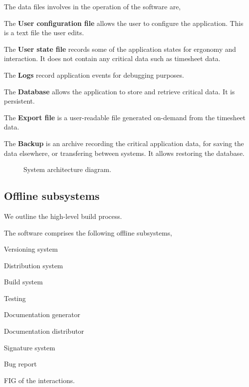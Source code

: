 The data files involves in the operation of the software are,
\begin{compactitem}
\item The \textbf{User configuration file} allows the user to configure the
  application. This is a text file the user edits.
\item The \textbf{User state file} records some of the application states
  for ergonomy and interaction. It does not contain any critical data such
  as timesheet data.
\item The \textbf{Logs} record application events for debugging purposes.
\item The \textbf{Database} allows the application to store and retrieve
  critical data. It is persistent.
\item The \textbf{Export file} is a user-readable file generated on-demand
  from the timesheet data.
\item The \textbf{Backup} is an archive recording the critical application
  data, for saving the data elsewhere, or transfering between systems.
  It allows restoring the database.
\end{compactitem}

\begin{figure}
  
  \caption{\label{fig:arch-diagram} System architecture diagram.}
\end{figure}

\subsection{Offline subsystems}
We outline the high-level build process.

The software comprises the following offline subsystems,
\begin{compactitem}
\item Versioning system
\item Distribution system
\item Build system
\item Testing
\item Documentation generator
\item Documentation distributor
\item Signature system
\item Bug report
\end{compactitem}

FIG of the interactions.